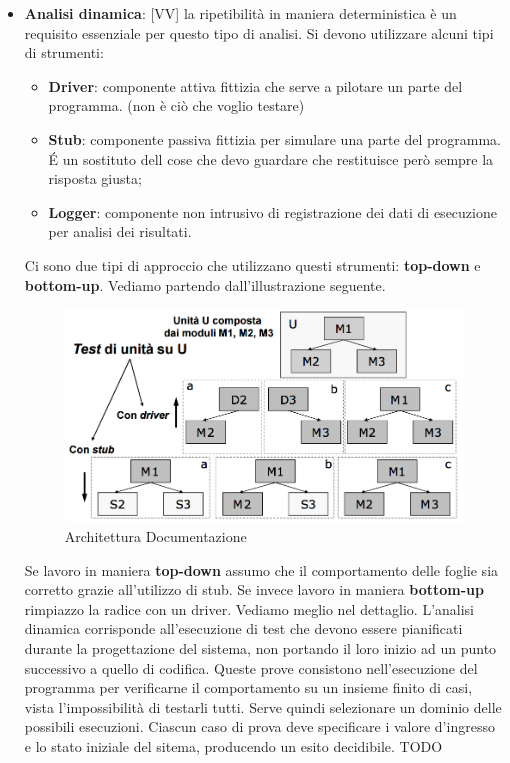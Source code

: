 \begin{itemize}
	\item \textbf{Analisi dinamica}: [VV] la ripetibilità in maniera deterministica è un requisito essenziale per questo tipo di analisi. Si devono utilizzare alcuni tipi di strumenti:
		\begin{itemize}
			\item \textbf{Driver}: componente attiva fittizia che serve a pilotare un parte del programma. (non è ciò che voglio testare)
			\item \textbf{Stub}: componente passiva fittizia per simulare una parte del programma. \'E un sostituto dell cose che devo guardare che restituisce però sempre la risposta giusta;
			\item \textbf{Logger}: componente non intrusivo di registrazione dei dati di esecuzione per analisi dei risultati.
		\end{itemize}
		\noindent
		Ci sono due tipi di approccio che utilizzano questi strumenti: \textbf{top-down} e \textbf{bottom-up}. Vediamo partendo dall'illustrazione seguente.
		\begin{figure}[htbp]
			\centering
			\includegraphics[scale=0.45]{img/stub_driver.png}
			\caption{Architettura Documentazione}
			\label{fig:arch_doc}
		\end{figure}
		Se lavoro in maniera \textbf{top-down} assumo che il comportamento delle foglie sia corretto grazie all'utilizzo di stub. Se invece lavoro in maniera \textbf{bottom-up} rimpiazzo la radice con un driver. Vediamo meglio nel dettaglio. \newline
		L'analisi dinamica corrisponde all'esecuzione di test che devono essere pianificati durante la progettazione del sistema, non portando il loro inizio ad un punto successivo a quello di codifica. Queste prove consistono nell'esecuzione del programma per verificarne il comportamento su un insieme finito di casi, vista l'impossibilità di testarli tutti. Serve quindi selezionare un dominio delle possibili esecuzioni. Ciascun caso di prova deve specificare i valore d'ingresso e lo stato iniziale del sitema, producendo un esito decidibile. TODO







\end{itemize}
